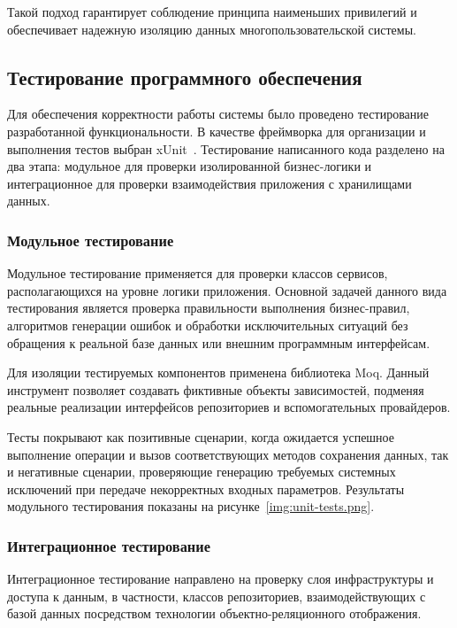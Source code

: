 Такой подход гарантирует соблюдение принципа наименьших привилегий и обеспечивает 
надежную изоляцию данных многопользовательской системы.

\subsection{Тестирование программного обеспечения}

Для обеспечения корректности работы системы было проведено тестирование разработанной
функциональности. В качестве фреймворка для организации и выполнения тестов выбран 
xUnit~\cite{ref:xunit}. Тестирование написанного кода разделено на два этапа: модульное для проверки 
изолированной бизнес-логики и интеграционное для проверки взаимодействия приложения с 
хранилищами данных.

\subsubsection{Модульное тестирование}

Модульное тестирование применяется для проверки классов сервисов, располагающихся на 
уровне логики приложения. Основной задачей данного вида тестирования является проверка 
правильности выполнения бизнес-правил, алгоритмов генерации ошибок и обработки исключительных 
ситуаций без обращения к реальной базе данных или внешним программным интерфейсам.

Для изоляции тестируемых компонентов применена библиотека Moq. Данный инструмент 
позволяет создавать фиктивные объекты зависимостей, подменяя реальные реализации 
интерфейсов репозиториев и вспомогательных провайдеров. 

Тесты покрывают как позитивные сценарии, когда ожидается успешное выполнение операции 
и вызов соответствующих методов сохранения данных, так и негативные сценарии, проверяющие 
генерацию требуемых системных исключений при передаче некорректных входных параметров.
Результаты модульного тестирования показаны на рисунке~\ref{img:unit-tests.png}.


\subsubsection{Интеграционное тестирование}

Интеграционное тестирование направлено на проверку слоя инфраструктуры и доступа к данным, 
в частности, классов репозиториев, взаимодействующих с базой данных посредством технологии 
объектно-реляционного отображения.

